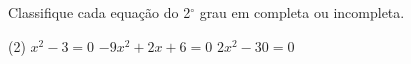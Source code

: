 \begin{question} 
Classifique cada equação do 2$^\circ$ grau em completa ou incompleta.
    \begin{tasks}(2)
       \task $x^2-3=0$
        \task $-9x^2+2x+6=0$
        \task $2x^2-30=0$
    \end{tasks}
\end{question}